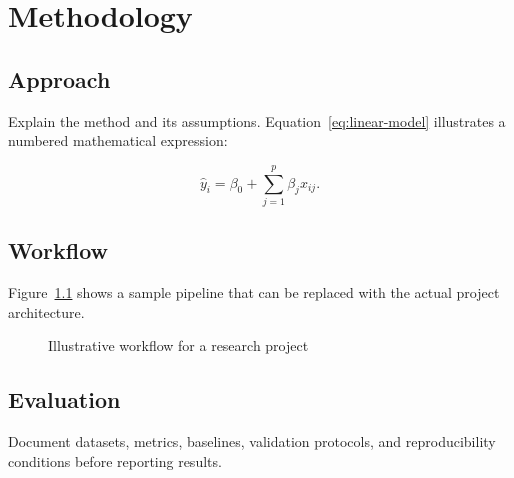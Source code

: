 \chapter{Methodology}
\label{ch:methodology}

\section{Approach}

Explain the method and its assumptions. Equation~\ref{eq:linear-model}
illustrates a numbered mathematical expression:

\begin{equation}
    \hat{y}_i = \beta_0 + \sum_{j=1}^{p} \beta_j x_{ij}.
    \label{eq:linear-model}
\end{equation}

\section{Workflow}

Figure~\ref{fig:workflow} shows a sample pipeline that can be replaced with
the actual project architecture.

\begin{figure}[htbp]
    \centering
    
    \caption{Illustrative workflow for a research project}
    \label{fig:workflow}
\end{figure}

\section{Evaluation}

Document datasets, metrics, baselines, validation protocols, and reproducibility
conditions before reporting results.

